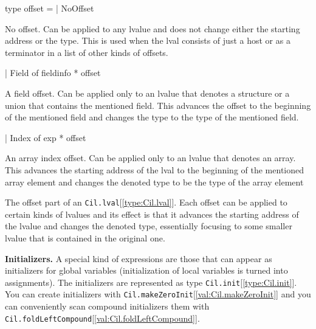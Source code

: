 \documentclass[11pt]{article}
\begin{document}
\label{type:Cil.offset}\begin{ocamldoccode}
type offset =
  | NoOffset
\end{ocamldoccode}
\begin{ocamldoccomment}
No offset. Can be applied to any lvalue and does 
 not change either the starting address or the type. 
 This is used when the lval consists of just a host 
 or as a terminator in a list of other kinds of 
 offsets.
\end{ocamldoccomment}
\begin{ocamldoccode}
  | Field of fieldinfo * offset
\end{ocamldoccode}
\begin{ocamldoccomment}
A field offset. Can be applied only to an lvalue 
 that denotes a structure or a union that contains 
 the mentioned field. This advances the offset to the 
 beginning of the mentioned field and changes the 
 type to the type of the mentioned field.
\end{ocamldoccomment}
\begin{ocamldoccode}
  | Index of exp * offset
\end{ocamldoccode}
\begin{ocamldoccomment}
An array index offset. Can be applied only to an 
 lvalue that denotes an array. This advances the 
 starting address of the lval to the beginning of the 
 mentioned array element and changes the denoted type 
 to be the type of the array element
\end{ocamldoccomment}
\begin{ocamldocdescription}
The offset part of an {\tt{Cil.lval}}[\ref{type:Cil.lval}]. Each offset can be applied to certain 
 kinds of lvalues and its effect is that it advances the starting address 
 of the lvalue and changes the denoted type, essentially focusing to some 
 smaller lvalue that is contained in the original one.


\end{ocamldocdescription}




{\bf Initializers.} A special kind of expressions are those that can appear 
 as initializers for global variables (initialization of local variables is 
 turned into assignments). The initializers are represented as type 
 {\tt{Cil.init}}[\ref{type:Cil.init}]. You can create initializers with {\tt{Cil.makeZeroInit}}[\ref{val:Cil.makeZeroInit}] and you 
 can conveniently scan compound initializers them with 
 {\tt{Cil.foldLeftCompound}}[\ref{val:Cil.foldLeftCompound}].
\end{document}
